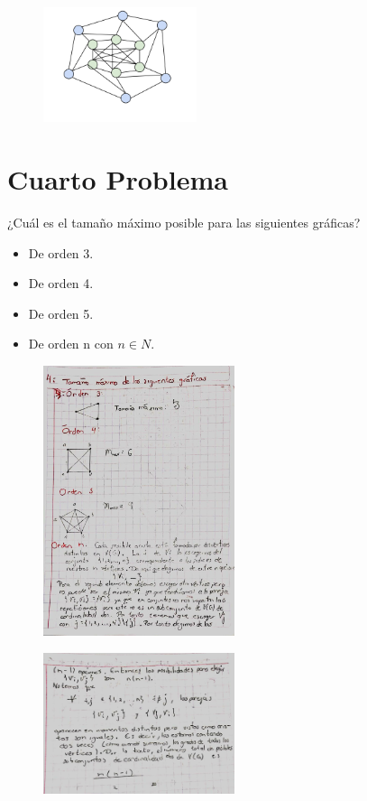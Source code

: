 \documentclass[journal,12pt,onecolumn]{IEEEtran}                %
\theoremstyle{break}                                            %
\begin{document}
        \begin{figure}[h]
            \includegraphics[width=0.4\textwidth]{3}
        \end{figure}
        
    \section*{Cuarto Problema}

        ¿Cuál es el tamaño máximo posible para las siguientes gráficas?
        \begin{itemize}
            \item De orden 3.
            \item De orden 4.
            \item De orden 5.
            \item De orden n con $n \in N$.
        \end{itemize}

        \begin{figure}[h]
            \includegraphics[width=0.5\textwidth]{41}
        \end{figure}

        \begin{figure}[h]
            \includegraphics[width=0.5\textwidth]{42}
        \end{figure}
\end{document}
